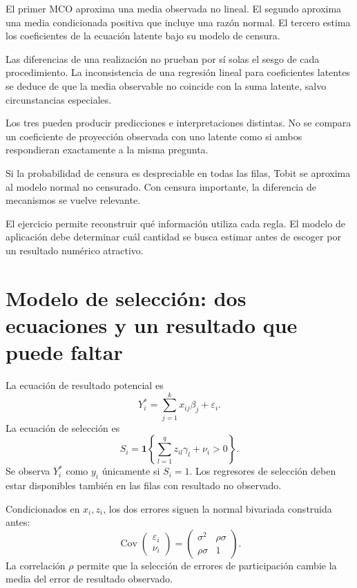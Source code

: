 \documentclass[11pt,a4paper]{article}
\DeclareMathOperator{\Cov}{Cov}
\begin{document}
El primer MCO aproxima una
media observada no lineal.
El segundo aproxima una
media condicionada positiva que
incluye una razón normal.
El tercero estima los
coeficientes de la ecuación latente
bajo su modelo de censura.

Las diferencias de una realización
no prueban por sí solas
el sesgo de cada procedimiento.
La inconsistencia de una regresión
lineal para coeficientes latentes
se deduce de que la
media observable no coincide
con la suma latente,
salvo circunstancias especiales.

Los tres pueden producir
predicciones e interpretaciones distintas.
No se compara un coeficiente
de proyección observada con
uno latente como si ambos
respondieran exactamente
a la misma pregunta.

\begin{ejemplo}
Si la probabilidad de censura
es despreciable en todas las filas,
Tobit se aproxima al
modelo normal no censurado.
Con censura importante,
la diferencia de mecanismos
se vuelve relevante.
\end{ejemplo}
El ejercicio permite reconstruir
qué información utiliza cada regla.
El modelo de aplicación
debe determinar cuál
cantidad se busca estimar
antes de escoger por
un resultado numérico atractivo.

\clearpage
{}
\section{Modelo de selección: dos ecuaciones y un resultado que puede faltar}\label{unidad121}
La ecuación de resultado potencial es
\[
Y_i^\ast=\sum_{j=1}^kx_{ij}\beta_j+\varepsilon_i.
\]
La ecuación de selección es
\[
S_i=\mathbf1\left\{\sum_{l=1}^qz_{il}\gamma_l+\nu_i>0\right\}.
\]
Se observa \(Y_i^\ast\) como \(y_i\)
únicamente si \(S_i=1\).
Los regresores de selección deben
estar disponibles también en las filas
con resultado no observado.

Condicionados en \(x_i,z_i\), los dos errores
siguen la normal bivariada construida antes:
\[
\Cov\begin{pmatrix}\varepsilon_i\\\nu_i\end{pmatrix}
=\begin{pmatrix}\sigma^2&\rho\sigma\\\rho\sigma&1\end{pmatrix}.
\]
La correlación \(\rho\) permite
que la selección de errores de
participación cambie la media
del error de resultado observado.
\end{document}
